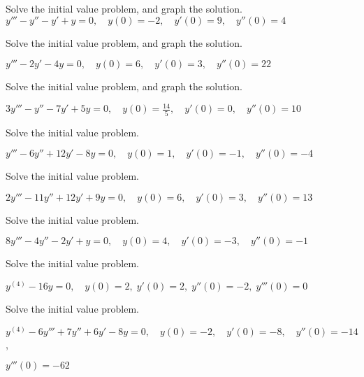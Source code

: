 \documentclass{ximera}
\begin{document}
\begin{problem}\label{exer:9.2.17} Solve the
initial value problem, and graph the solution.
$y'''-y''-y'+y=0, \quad  y(0)=-2,\quad y'(0)=9,\quad y''(0)=4$
\end{problem}

\begin{problem}\label{exer:9.2.18} Solve the
initial value problem, and graph the solution.

$y'''-2y'-4y=0, \quad  y(0)=6,\quad y'(0)=3,\quad y''(0)=22$
\end{problem}

\begin{problem}\label{exer:9.2.19} Solve the
initial value problem, and graph the solution.

$3y'''-y''-7y'+5y=0, \quad  y(0)=\frac{14}{5},\quad y'(0)=0,\quad y''(0)=10$
\end{problem}

\begin{problem}\label{exer:9.2.20}  Solve the
initial value problem.

$y'''-6y''+12y'-8y=0, \quad  y(0)=1,\quad y'(0)=-1,\quad y''(0)=-4$
\end{problem}

\begin{problem}\label{exer:9.2.21}  Solve the
initial value problem.

$2y'''-11y''+12y'+9y=0, \quad  y(0)=6,\quad y'(0)=3,\quad y''(0)=13$
\end{problem}

\begin{problem}\label{exer:9.2.22}  Solve the
initial value problem.

$8y'''-4y''-2y'+y=0, \quad  y(0)=4,\quad y'(0)=-3,\quad y''(0)=-1$
\end{problem}

\begin{problem}\label{exer:9.2.23}  Solve the
initial value problem.

$y^{(4)}-16y=0, \quad   y(0)=2,\;  y'(0)=2,\;  y''(0)=-2,\;  y'''(0)=0$
\end{problem}

\begin{problem}\label{exer:9.2.24}  Solve the
initial value problem.

$y^{(4)}-6y'''+7y''+6y'-8y=0, \quad  y(0)=-2,\quad y'(0)=-8,\quad y''(0)=-14$,

 $y'''(0)=-62$
\end{problem}
\end{document}
